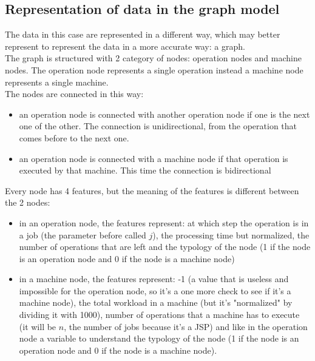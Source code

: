 \documentclass[12pt]{book}
\begin{document}
\subsection{Representation of data in the graph model}
The data in this case are represented in a different way, which may better represent to represent the data in a more accurate way: a graph\cite{Vesselinova2020}.\\
The graph is structured with 2 category of nodes: operation nodes and machine nodes. The operation node represents a single operation instead a machine node represents a single machine.\\
The nodes are connected in this way:
\begin{itemize}
    \item an operation node is connected with another operation node if one is the next one of the other. The connection is unidirectional, from the operation that comes before to the next one.
    \item an operation node is connected with a machine node if that operation is executed by that machine. This time the connection is bidirectional
\end{itemize}
Every node has 4 features, but the meaning of the features is different between the 2 nodes:
\begin{itemize}
    \item in an operation node, the features represent: at which step the operation is in a job (the parameter before called $j$), the processing time but normalized, the number of operations that are left and the typology of the node (1 if the node is an operation node and 0 if the node is a machine node)
    \item in a machine node, the features represent: -1 (a value that is useless and impossible for the operation node, so it's a one more check to see if it's a machine node), the total workload in a machine (but it's "normalized" by dividing it with 1000), number of operations that a machine has to execute (it will be $n$, the number of jobs because it's a JSP) and like in the operation node a variable to understand the typology of the node (1 if the node is an operation node and 0 if the node is a machine node).
\end{itemize}
\end{document}
